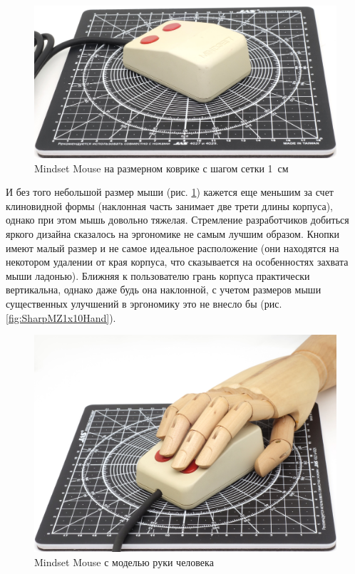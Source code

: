 \documentclass[11pt, a4paper]{article}
\begin{document}
\begin{figure}[h]
    \centering
    \includegraphics[scale=0.5]{1984_mindset_mouse/size_15.jpg}
    \caption{Mindset Mouse на размерном коврике с шагом сетки 1~см}
    \label{fig:MindsetMouseSize}
\end{figure}

И без того небольшой размер мыши (рис. \ref{fig:MindsetMouseSize}) кажется еще меньшим за счет клиновидной формы (наклонная часть занимает две трети длины корпуса), однако при этом мышь довольно тяжелая. Стремление разработчиков добиться яркого дизайна сказалось на эргономике не самым лучшим образом. Кнопки имеют малый размер и не самое идеальное расположение (они находятся на некотором удалении от края корпуса, что сказывается на особенностях захвата мыши ладонью). Ближняя к пользователю грань корпуса практически вертикальна, однако даже будь она наклонной, с учетом размеров мыши существенных улучшений в эргономику это не внесло бы (рис. \ref{fig:SharpMZ1x10Hand}).

\begin{figure}[h]
    \centering
    \includegraphics[scale=0.5]{1984_mindset_mouse/hand_30.jpg}
    \caption{Mindset Mouse с моделью руки человека}
    \label{fig:MindsetMouseHand}
\end{figure}
\end{document}
